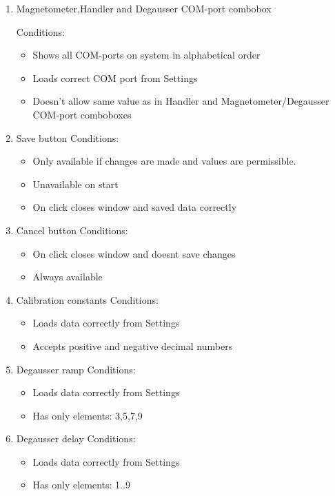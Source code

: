 \begin{enumerate}

\item Magnetometer,Handler and Degausser COM-port combobox

Conditions:
\begin{itemize}
\item Shows all COM-ports on system in alphabetical order
\item Loads correct COM port from Settings
\item Doesn't allow same value as in Handler and Magnetometer/Degausser COM-port comboboxes
\end{itemize}

\item Save button
Conditions:
\begin{itemize}
\item Only available if changes are made and values are permissible.
\item Unavailable on start
\item On click closes window and saved data correctly
\end{itemize}

\item Cancel button
Conditions:
\begin{itemize}
\item On click closes window and doesnt save changes
\item Always available
\end{itemize}

\item Calibration constants
Conditions:
\begin{itemize}
\item Loads data correctly from Settings
\item Accepts positive and negative decimal numbers
\end{itemize}

\item Degausser ramp
Conditions:
\begin{itemize}
\item Loads data correctly from Settings
\item Has only elements: 3,5,7,9
\end{itemize}

\item Degausser delay
Conditions:
\begin{itemize}
\item Loads data correctly from Settings
\item Has only elements: 1..9
\end{itemize}


\end{enumerate}
